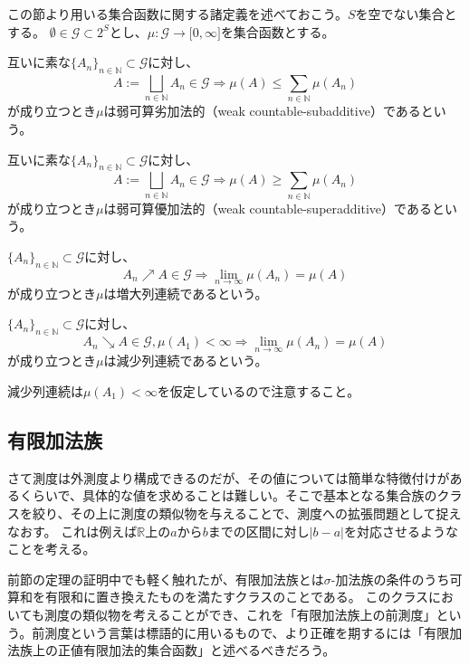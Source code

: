 \documentclass[../root.tex]{subfiles}
\begin{document}
この節より用いる集合函数に関する諸定義を述べておこう。$ S $を空でない集合とする。
$ \emptyset\in\mathscr{G}\subset 2^{S} $とし、$ \mu\colon\mathscr{G}\rightarrow\lbrack 0, \infty \rbrack $を集合函数とする。
\begin{EnumCond}
\item 互いに素な$ \lbrace A_{n} \rbrace_{n\in\mathbb{N}}\subset\mathscr{G} $に対し、
\[ A:=\bigsqcup_{n\in\mathbb{N}}A_{n}\in\mathscr{G} \Rightarrow \mu( A )\le\sum_{n\in\mathbb{N}}\mu( A_{n} ) \]
が成り立つとき$ \mu $は弱可算劣加法的（weak countable-subadditive）であるという。
\item 互いに素な$ \lbrace A_{n} \rbrace_{n\in\mathbb{N}}\subset\mathscr{G} $に対し、
\[ A:=\bigsqcup_{n\in\mathbb{N}}A_{n}\in\mathscr{G} \Rightarrow \mu( A )\ge\sum_{n\in\mathbb{N}}\mu( A_{n} ) \]
が成り立つとき$ \mu $は弱可算優加法的（weak countable-superadditive）であるという。
\item $ \lbrace A_{n} \rbrace_{n\in\mathbb{N}}\subset\mathscr{G} $に対し、
\[ A_{n}\nearrow A\in\mathscr{G} \Rightarrow \lim_{n\rightarrow\infty}\mu( A_{n} )=\mu( A ) \]
が成り立つとき$ \mu $は増大列連続であるという。
\item $ \lbrace A_{n} \rbrace_{n\in\mathbb{N}}\subset\mathscr{G} $に対し、
\[ A_{n}\searrow A\in\mathscr{G}, \mu( A_{1} )\lt \infty \Rightarrow \lim_{n\rightarrow\infty}\mu( A_{n} )=\mu( A ) \]
が成り立つとき$ \mu $は減少列連続であるという。
\end{EnumCond}

減少列連続は$ \mu( A_{1} )\lt\infty $を仮定しているので注意すること。




\subsection{有限加法族}
さて測度は外測度より構成できるのだが、その値については簡単な特徴付けがあるくらいで、具体的な値を求めることは難しい。そこで基本となる集合族のクラスを絞り、その上に測度の類似物を与えることで、測度への拡張問題として捉えなおす。
これは例えば$ \mathbb{R} $上の$ a $から$ b $までの区間に対し$ | b-a | $を対応させるようなことを考える。

前節の定理の証明中でも軽く触れたが、有限加法族とは$ \sigma $-加法族の条件のうち可算和を有限和に置き換えたものを満たすクラスのことである。
このクラスにおいても測度の類似物を考えることができ、これを「有限加法族上の前測度」という。前測度という言葉は標語的に用いるもので、より正確を期するには「有限加法族上の正値有限加法的集合函数」と述べるべきだろう。
\end{document}
